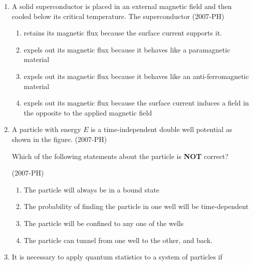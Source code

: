 \documentclass[journal]{IEEEtran}
\begin{document}
\begin{enumerate}
\begin{enumerate}
    \end{enumerate}
    \item A solid superconductor is placed in an external magnetic field and then cooled below its critical temperature. The superconductor \hfill (2007-PH)
    \begin{enumerate}
        \item retains its magnetic flux because the surface current supports it.
        \item expels out its magnetic flux because it behaves like a paramagnetic material 
        \item expels out its magnetic flux because it behaves like an anti-ferromagnetic material 
        \item expels out its magnetic flux because the surface current induces a field in the opposite to the applied magnetic field 
    \end{enumerate}
    \item A particle with energy $E$ is a time-independent double well potential as shown in the figure. \hfill (2007-PH)
     
    
    Which of the following statements about the particle is \textbf{NOT} correct?

    \hfill (2007-PH)
    \begin{enumerate}
            \item The particle will always be in a bound state  
            \item The probability of finding the particle in one well will be time-dependent
            \item The particle will be confined to any one of the wells 
            \item The particle can tunnel from one well to the other, and back.
    \end{enumerate}
    \item It is necessary to apply quantum statistics to a system of particles if


\end{enumerate}
\end{document}
